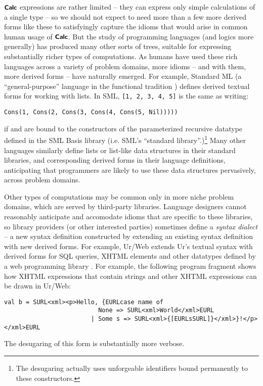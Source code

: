 $\textsf{\textbf{\small Calc}}$ expressions are rather limited -- they can express only simple calculations of a single type -- so we should not expect to need more than a few more derived forms like these to satisfyingly capture the  idioms that would arise in common human usage of $\textsf{\textbf{\small Calc}}$. %
But the study of programming languages (and logics more generally) has produced many other sorts of trees, suitable for expressing substantially richer types of computations.  As humans have used these rich languages across a variety of problem domains, more idioms -- and with them, more derived forms -- have naturally emerged.  For example, Standard ML (a ``general-purpose''  language in the functional tradition \cite{mthm97-for-dart,harper1997programming}) defines derived textual forms for working with lists. In SML, \lstinline{[1, 2, 3, 4, 5]} is the same as writing: 
\begin{lstlisting}[numbers=none]
Cons(1, Cons(2, Cons(3, Cons(4, Cons(5, Nil)))))
\end{lstlisting}
if  and  are bound to the constructors of the parameterized recursive datatype  defined in the SML Basis library (i.e. SML's ``standard library''.)\footnote{The desugaring actually uses unforgeable identifiers bound permanently to these constructors.} Many other languages similarly define lists or list-like data structures in their standard libraries, and corresponding derived forms in their language definitions, anticipating that programmers are likely to use these data structures pervasively, across problem domains.

Other types of computations may be common only in more niche problem domains, which are served by third-party libraries. Language designers cannot reasonably anticipate and accomodate idioms that are specific to these libraries, so library providers (or other interested parties) sometimes define a \emph{syntax dialect} -- a new syntax definition constructed by extending an existing syntax definition with new derived forms. For example, Ur/Web extends Ur's textual syntax with derived forms for SQL queries, XHTML elements and other datatypes defined by a web programming library \cite{conf/popl/Chlipala15}. For example, the following program fragment shows how XHTML expressions that contain strings and other XHTML expressions can be drawn in Ur/Web: %
\begin{lstlisting}[numbers=none]
val b = SURL<xml><p>Hello, {EURLcase name of
                          None => SURL<xml>World</xml>EURL
                        | Some s => SURL<xml>{[EURLsSURL]}</xml>}!</p></xml>EURL
\end{lstlisting}                              
The desugaring of this form is substantially more verbose.

